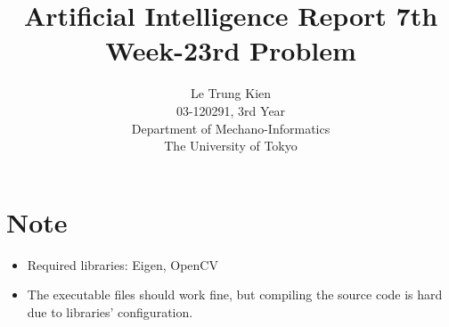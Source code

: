 \documentclass[a4paper, 11pt]{article}
\begin{document}
\title{Artificial Intelligence Report 7th Week-23rd Problem}
\author{Le Trung Kien\\ 
  03-120291, 3rd Year \\
  Department of Mechano-Informatics \\ 
  The University of Tokyo
}
\maketitle

\section*{Note}
\begin{itemize}
\item Required libraries: Eigen, OpenCV
\item The executable files should work fine, but compiling the source code is hard due to libraries' configuration.
\end{itemize}

\newpage
\end{document}
